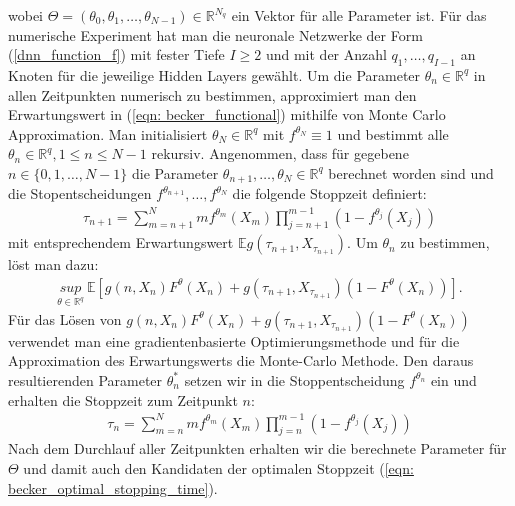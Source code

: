 \documentclass[12pt,titlepage,headsepline]{article}
\begin{document}
      wobei $\Theta = (\theta_0,\theta_1,\ldots,\theta_{N-1}) \in \mathbb{R}^{N_q}$ ein Vektor für alle Parameter ist.
      \hfill\break
      Für das numerische Experiment hat man die neuronale Netzwerke der Form (\ref{dnn_function_f}) mit fester Tiefe $I \geq 2$ und mit der Anzahl $q_1,\ldots,q_{I-1}$ an Knoten für die jeweilige Hidden Layers gewählt. Um die Parameter $\theta_n \in \mathbb{R}^q$ in allen Zeitpunkten numerisch zu bestimmen, approximiert man den Erwartungswert in (\ref{eqn: becker_functional}) mithilfe von Monte Carlo Approximation.
      \hfill\break
      Man initialisiert $\theta_N \in \mathbb{R}^q$ mit $f^{\theta_N} \equiv 1$ und bestimmt alle $\theta_n \in \mathbb{R}^q, 1 \leq n \leq N-1$ rekursiv. Angenommen, dass für gegebene $n \in \{0,1,\ldots,N-1\}$ die Parameter $\theta_{n+1},\ldots,\theta_N \in \mathbb{R}^q$ berechnet worden sind und die Stopentscheidungen $f^{\theta_{n+1}},\ldots,f^{\theta_N}$ die folgende Stoppzeit definiert:
      \begin{align*}
        \tau_{n+1} = \sum_{m={n+1}}^N mf^{\theta_m}(X_m)\prod_{j={n+1}}^{m-1}(1-f^{\theta_j}(X_j))
      \end{align*}
      mit entsprechendem Erwartungswert $\mathbb{E}g(\tau_{n+1},X_{\tau_{n+1}})$. Um $\theta_n$ zu bestimmen, löst man dazu:
      \begin{align*}
        \underset{\theta \in \mathbb{R}^q}{sup} \ \mathbb{E}[g(n,X_n)F^{\theta}(X_n)+g(\tau_{n+1},X_{\tau_{n+1}})(1-F^{\theta}(X_n))].
      \end{align*}
      Für das Lösen von $g(n,X_n)F^{\theta}(X_n)+g(\tau_{n+1},X_{\tau_{n+1}})(1-F^{\theta}(X_n))$ verwendet man eine gradientenbasierte Optimierungsmethode und für die Approximation des Erwartungswerts die Monte-Carlo Methode. Den daraus resultierenden Parameter $\theta_n^*$ setzen wir in die Stoppentscheidung $f^{\theta_n}$ ein und erhalten die Stoppzeit zum Zeitpunkt $n$:
      \begin{align*}
        \tau_{n} = \sum_{m={n}}^N mf^{\theta_m}(X_m)\prod_{j={n}}^{m-1}(1-f^{\theta_j}(X_j))
      \end{align*}
      Nach dem Durchlauf aller Zeitpunkten erhalten wir die berechnete Parameter für $\Theta$ und damit auch den Kandidaten der optimalen Stoppzeit (\ref{eqn: becker_optimal_stopping_time}).
\end{document}
